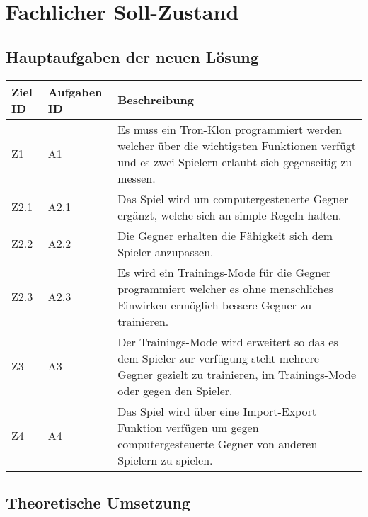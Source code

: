 \usetikzlibrary{arrows,positioning}
\section{Fachlicher Soll-Zustand}


\subsection{Hauptaufgaben der neuen Lösung}

\begin{tabularx}{\textwidth}{| p{0.7cm} | p{1.5cm} | X |}
\hline
\rowcolor[gray]{0.9} Ziel ID & Aufgaben ID & Beschreibung \\
\hline
Z1 & A1 & Es muss ein Tron-Klon programmiert werden welcher über die wichtigsten Funktionen verfügt und es zwei Spielern erlaubt sich gegenseitig zu messen.\\
\hline
Z2.1 & A2.1 & Das Spiel wird um computergesteuerte Gegner ergänzt, welche sich an simple Regeln halten. \\
\hline
Z2.2 & A2.2 & Die Gegner erhalten die Fähigkeit sich dem Spieler anzupassen. \\
\hline 
Z2.3 & A2.3 & Es wird ein Trainings-Mode für die Gegner programmiert welcher es ohne menschliches Einwirken ermöglich bessere Gegner zu trainieren. \\
\hline
Z3 & A3 & Der Trainings-Mode wird erweitert so das es dem Spieler zur verfügung steht mehrere Gegner gezielt zu trainieren, im Trainings-Mode oder gegen den Spieler. \\
\hline
Z4 & A4 & Das Spiel wird über eine Import-Export Funktion verfügen um gegen computergesteuerte Gegner von anderen Spielern zu spielen. \\
\hline
\end{tabularx}

\subsection{Theoretische Umsetzung}

